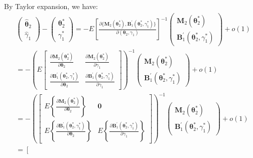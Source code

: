 \documentclass[12pt]{article}
\begin{document}
By Taylor expansion, we have:
\begin{align*}
    &\left(\begin{array}{l}\widehat{\bm{\theta}}_2\\\widehat{\gamma}_1\end{array}\right) - \left(\begin{array}{l}
    \bm{\theta}_2^* \\ \gamma_1^* \end{array}\right) = - E\left[ \frac{\partial\{\bm{M}_2(\bm{\theta}_2^*),\bm{B}_1^{\prime}(\bm{\theta}_2^*,\gamma_1^*)\}}{\partial (\bm{\theta}_2, \gamma_1)}  \right]^{-1} \left(\begin{array}{l}
    \bm{M}_2(\bm{\theta}_2^*) \\ \bm{B}_1^{\prime}(\bm{\theta}_2^*,\gamma_1^*) \end{array}\right) + o(1)\\
    &= -\left( E\left[ \begin{array}{ll}
    \frac{\partial \bm{M}_2(\bm{\theta}_2^*)}{\partial \bm{\theta}_2} & \frac{\partial \bm{M}_2(\bm{\theta}_2^*)}{\partial \gamma_1}\\ \frac{\partial \bm{B}_1^{\prime}(\bm{\theta}_2^*,\gamma_1^*)}{\partial \bm{\theta}_2} & \frac{\partial \bm{B}_1^{\prime}(\bm{\theta}_2^*,\gamma_1^*)}{\partial \gamma_1}\end{array} \right]\right)^{-1}\left(\begin{array}{l}
    \bm{M}_2(\bm{\theta}_2^*) \\ \bm{B}_1^{\prime}(\bm{\theta}_2^*,\gamma_1^*) \end{array}\right) + o(1)\\
    & = -\left(\left[ \begin{array}{ll}
    E\left\{\frac{\partial \bm{M}_2(\bm{\theta}_2^*)}{\partial \bm{\theta}_2}\right\} & \bm{0}\\ E\left\{\frac{\partial \bm{B}_1^{\prime}(\bm{\theta}_2^*,\gamma_1^*)}{\partial \bm{\theta}_2}\right\} & E\left\{\frac{\partial \bm{B}_1^{\prime}(\bm{\theta}_2^*,\gamma_1^*)}{\partial \gamma_1}\right\} \end{array} \right]\right)^{-1} \left(\begin{array}{l}
    \bm{M}_2(\bm{\theta}_2^*) \\ \bm{B}_1^{\prime}(\bm{\theta}_2^*,\gamma_1^*) \end{array}\right) + o(1)\\
    &= \left[ \begin{array}{ll}

\end{array}
\end{align*}
\end{document}
